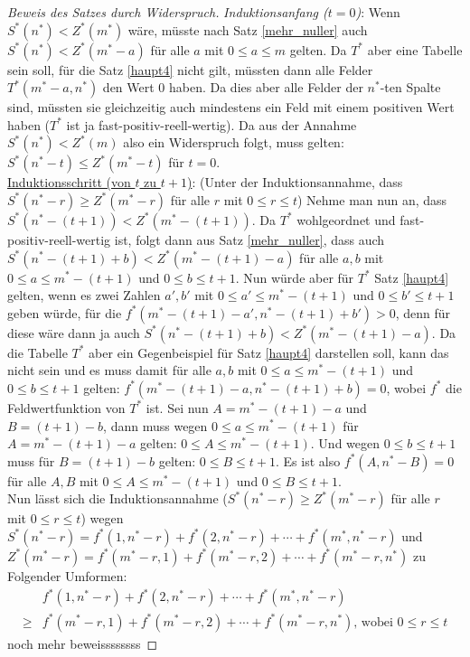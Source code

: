 \begin{proof}[Beweis des Satzes durch Widerspruch]
    \textit{Induktionsanfang ($t=0$)}: Wenn $S^*(n^*) < Z^*(m^*)$ wäre, müsste nach Satz \ref{mehr_nuller} 
    auch $S^*(n^*) < Z^*(m^*-a)$ für alle $a$ mit $0 \leq a \leq m$ gelten. Da $T^*$ aber eine Tabelle 
    sein soll, für die Satz \ref{haupt4} nicht gilt, müssten dann alle Felder $T^*(m^*-a, n^*)$ den Wert 0 haben. 
    Da dies aber alle Felder der $n^*$-ten Spalte sind, müssten sie gleichzeitig auch mindestens ein Feld 
    mit einem positiven Wert haben ($T^*$ ist ja fast-positiv-reell-wertig). Da aus der Annahme $S^*(n^*) < Z^*(m)$ 
    also ein Widerspruch folgt, muss gelten: $S^*(n^*-t) \leq Z^*(m^*-t)$ für $t=0$.\\
    \underline{Induktionsschritt (von $t$ zu $t+1$)}: (Unter der Induktionsannahme, dass $S^*(n^*-r) \geq 
    Z^*(m^*-r)$ für alle $r$ mit $0 \leq r \leq t$) Nehme man nun an, dass $S^*(n^*-(t+1)) < Z^*(m^*-(t+1))$. 
    Da $T^*$ wohlgeordnet und fast-positiv-reell-wertig ist, folgt dann aus Satz \ref{mehr_nuller}, 
    dass auch $S^*(n^*-(t+1)+b) < Z^*(m^*-(t+1)-a)$ für alle $a, b$ mit $0\leq a\leq m^*-(t+1)$ und 
    $0\leq b\leq t+1$. Nun würde aber für $T^*$ Satz \ref{haupt4} gelten, wenn es zwei Zahlen $a', b'$ mit 
    $0\leq a'\leq m^*-(t+1)$ und $0\leq b'\leq t+1$ geben würde, für die $f^*(m^*-(t+1)-a', n^*-(t+1)+b') >0$, 
    denn für diese wäre dann ja auch $S^*(n^*-(t+1)+b) < Z^*(m^*-(t+1)-a)$. Da die Tabelle $T^*$ aber ein 
    Gegenbeispiel für Satz \ref{haupt4} darstellen soll, kann das nicht sein und es muss damit für alle $a, b$ 
    mit $0\leq a\leq m^*-(t+1)$ und $0\leq b\leq t+1$ gelten: $f^*(m^*-(t+1)-a, n^*-(t+1)+b)=0$, wobei $f^*$ die 
    Feldwertfunktion von $T^*$ ist. Sei nun $A=m^*-(t+1)-a$ und $B=(t+1)-b$, dann muss wegen $0\leq a\leq m^*-(t+1)$ 
    für $A=m^*-(t+1)-a$ gelten: $0\leq A\leq m^*-(t+1)$. Und wegen $0\leq b\leq t+1$ muss für $B=(t+1)-b$ gelten: 
    $0 \leq B\leq t+1$. Es ist also $f^*(A, n^*-B) =0$ für alle $A,B$ mit $0\leq A\leq m^*-(t+1)$ und $0 \leq B
    \leq t+1$.\\
    Nun lässt sich die Induktionsannahme ($S^*(n^*-r) \geq Z^*(m^*-r)$ für alle $r$ mit $0 \leq r \leq t$) wegen 
    $S^*(n^*-r)=f^*(1,n^*-r) + f^*(2,n^*-r)+\cdots +f^*(m^*,n^*-r)$ und $Z^*(m^*-r)=f^*(m^*-r, 1) + f^*(m^*-r, 2) 
    + \cdots + f^*(m^*-r, n^*)$ zu Folgender Umformen:
    \begin{align*}
        &f^*(1,n^*-r)+f^*(2,n^*-r)+\cdots+f^*(m^*,n^*-r)\\ 
        \geq &f^*(m^*-r, 1)+f^*(m^*-r, 2)+\cdots +f^*(m^*-r, n^*)\text{, wobei $0 \leq r \leq t$}
    \end{align*}
    noch mehr beweissssssss
    \renewcommand{\qedsymbol}{$\blacksquare$}
\end{proof}